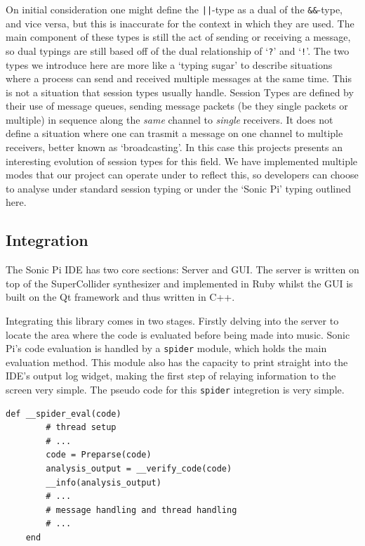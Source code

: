 \documentclass[11pt, abstracton, twoside, titlepage=true]{scrartcl}
\begin{document}
On initial consideration one might define the \texttt{||}-type as a dual of the
\texttt{\&\&}-type, and vice versa, but this is inaccurate for the context in which
they are used. The main component of these types is still the act of sending or
receiving a message, so dual typings are still based off of the dual relationship
of `\texttt{?}' and `\texttt{!}'. The two types we introduce here are more like
a `typing sugar' to describe situations where a process can send and received
multiple messages at the same time. This is not a situation that session types
usually handle. Session Types are defined by their use of message queues, sending
message packets (be they single packets or multiple) in sequence along the 
\emph{same} channel to \emph{single} receivers. It does not define a situation
where one can trasmit a message on one channel to multiple receivers, better known 
as `broadcasting'. In this case
this projects presents an interesting evolution of session types for this field.
We have implemented multiple modes that our project can operate under to reflect
this, so developers can choose to analyse under standard session typing or under 
the `Sonic Pi' typing outlined here.
\newpage

\subsection{Integration}
The Sonic Pi IDE has two core sections: Server and GUI. The server is written on 
top of the SuperCollider synthesizer and implemented in Ruby whilst the GUI is 
built on the Qt framework and thus written in C++.

Integrating this library comes in two stages. Firstly delving into the server to 
locate the area where the code is evaluated before being made into music. Sonic 
Pi's code evaluation is handled by a \texttt{spider} module, which holds the main 
evaluation method. This module also has the capacity to print straight into the 
IDE's output log widget, making the first step of relaying information to the 
screen very simple. The pseudo code for this \texttt{spider} integretion is very
simple.
\\
\begin{lstlisting}[style = sonicpi]
    def __spider_eval(code)
        # thread setup
        # ...
        code = Preparse(code)
        analysis_output = __verify_code(code)
        __info(analysis_output)
        # ...
        # message handling and thread handling
        # ...
    end
\end{lstlisting}
\end{document}
